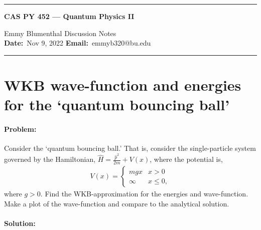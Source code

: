 \documentclass[10pt]{article}
\newcommand{\1}{\mathbf 1}
\begin{document}
\begin{center}
	\hrule
	\vspace{.4cm}
	{\textbf { \large CAS PY 452 --- Quantum Physics II}}
\end{center}
Emmy Blumenthal \hspace{\fill} \hspace{\fill}  \textbf{} Discussion Notes\  \\
\textbf{Date:}\  Nov 9, 2022   \hspace{\fill} \textbf{Email:}\ emmyb320@bu.edu 
\vspace{.4cm}
\hrule

\section*{WKB wave-function and energies for the `quantum bouncing ball'}


\paragraph{Problem:}

Consider the `quantum bouncing ball.' That is, consider the single-particle system governed by the Hamiltonian, $\hat H = \frac{\hat p^2}{2m} + V(x)$, where the potential is,
\begin{align}
	V(x) = \begin{cases}
		m g x & x> 0\\
		\infty  & x \leq 0,
	\end{cases}
\end{align}
where $g>0$.
Find the WKB-approximation for the energies and wave-function.
Make a plot of the wave-function and compare to the analytical solution.

\paragraph{Solution:}
\end{document}
